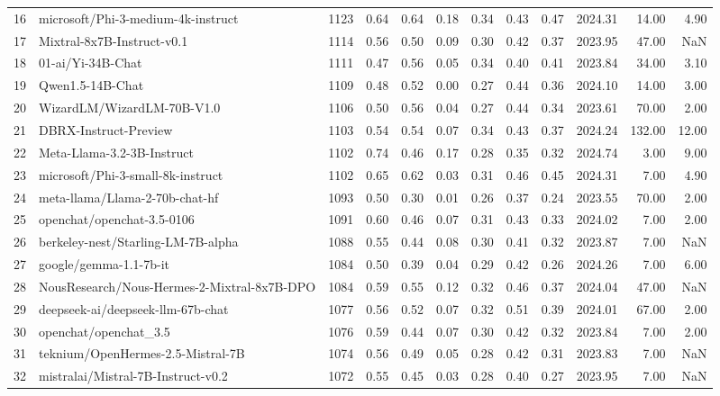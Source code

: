 \begin{tiny}
\begin{tabular}{llrrrrrrrrrr}
    16 & microsoft/Phi-3-medium-4k-instruct & 1123 & 0.64 & 0.64 & 0.18 & 0.34 & 0.43 & 0.47 & 2024.31 & 14.00 & 4.90 \\
    17 & Mixtral-8x7B-Instruct-v0.1 & 1114 & 0.56 & 0.50 & 0.09 & 0.30 & 0.42 & 0.37 & 2023.95 & 47.00 & NaN \\
    18 & 01-ai/Yi-34B-Chat & 1111 & 0.47 & 0.56 & 0.05 & 0.34 & 0.40 & 0.41 & 2023.84 & 34.00 & 3.10 \\
    19 & Qwen1.5-14B-Chat & 1109 & 0.48 & 0.52 & 0.00 & 0.27 & 0.44 & 0.36 & 2024.10 & 14.00 & 3.00 \\
    20 & WizardLM/WizardLM-70B-V1.0 & 1106 & 0.50 & 0.56 & 0.04 & 0.27 & 0.44 & 0.34 & 2023.61 & 70.00 & 2.00 \\
    21 & DBRX-Instruct-Preview & 1103 & 0.54 & 0.54 & 0.07 & 0.34 & 0.43 & 0.37 & 2024.24 & 132.00 & 12.00 \\
    22 & Meta-Llama-3.2-3B-Instruct & 1102 & 0.74 & 0.46 & 0.17 & 0.28 & 0.35 & 0.32 & 2024.74 & 3.00 & 9.00 \\
    23 & microsoft/Phi-3-small-8k-instruct & 1102 & 0.65 & 0.62 & 0.03 & 0.31 & 0.46 & 0.45 & 2024.31 & 7.00 & 4.90 \\
    24 & meta-llama/Llama-2-70b-chat-hf & 1093 & 0.50 & 0.30 & 0.01 & 0.26 & 0.37 & 0.24 & 2023.55 & 70.00 & 2.00 \\
    25 & openchat/openchat-3.5-0106 & 1091 & 0.60 & 0.46 & 0.07 & 0.31 & 0.43 & 0.33 & 2024.02 & 7.00 & 2.00 \\
    26 & berkeley-nest/Starling-LM-7B-alpha & 1088 & 0.55 & 0.44 & 0.08 & 0.30 & 0.41 & 0.32 & 2023.87 & 7.00 & NaN \\
    27 & google/gemma-1.1-7b-it & 1084 & 0.50 & 0.39 & 0.04 & 0.29 & 0.42 & 0.26 & 2024.26 & 7.00 & 6.00 \\
    28 & NousResearch/Nous-Hermes-2-Mixtral-8x7B-DPO & 1084 & 0.59 & 0.55 & 0.12 & 0.32 & 0.46 & 0.37 & 2024.04 & 47.00 & NaN \\
    29 & deepseek-ai/deepseek-llm-67b-chat & 1077 & 0.56 & 0.52 & 0.07 & 0.32 & 0.51 & 0.39 & 2024.01 & 67.00 & 2.00 \\
    30 & openchat/openchat\_3.5 & 1076 & 0.59 & 0.44 & 0.07 & 0.30 & 0.42 & 0.32 & 2023.84 & 7.00 & 2.00 \\
    31 & teknium/OpenHermes-2.5-Mistral-7B & 1074 & 0.56 & 0.49 & 0.05 & 0.28 & 0.42 & 0.31 & 2023.83 & 7.00 & NaN \\
    32 & mistralai/Mistral-7B-Instruct-v0.2 & 1072 & 0.55 & 0.45 & 0.03 & 0.28 & 0.40 & 0.27 & 2023.95 & 7.00 & NaN \\

\end{tabular}
\end{tiny}
